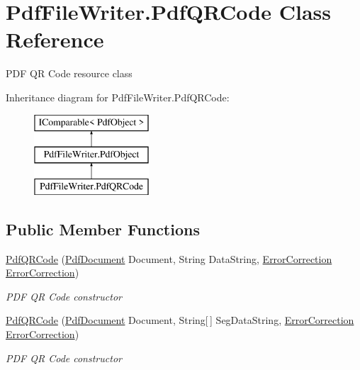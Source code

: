 \hypertarget{class_pdf_file_writer_1_1_pdf_q_r_code}{}\section{Pdf\+File\+Writer.\+Pdf\+Q\+R\+Code Class Reference}
\label{class_pdf_file_writer_1_1_pdf_q_r_code}


P\+DF QR Code resource class  


Inheritance diagram for Pdf\+File\+Writer.\+Pdf\+Q\+R\+Code\+:\begin{figure}[H]
\begin{center}
\leavevmode
\includegraphics[height=3.000000cm]{class_pdf_file_writer_1_1_pdf_q_r_code}
\end{center}
\end{figure}
\subsection*{Public Member Functions}
\begin{DoxyCompactItemize}
\item 
\hyperlink{class_pdf_file_writer_1_1_pdf_q_r_code_a20151e5e5e76d6fe0626697d987ea29a}{Pdf\+Q\+R\+Code} (\hyperlink{class_pdf_file_writer_1_1_pdf_document}{Pdf\+Document} Document, String Data\+String, \hyperlink{namespace_pdf_file_writer_ab10bd1f8ed3523b70c151f8d49093962}{Error\+Correction} \hyperlink{namespace_pdf_file_writer_ab10bd1f8ed3523b70c151f8d49093962}{Error\+Correction})
\begin{DoxyCompactList}\small\item\em P\+DF QR Code constructor \end{DoxyCompactList}\item 
\hyperlink{class_pdf_file_writer_1_1_pdf_q_r_code_a885c2236533d4b3bdc14fde8876c773d}{Pdf\+Q\+R\+Code} (\hyperlink{class_pdf_file_writer_1_1_pdf_document}{Pdf\+Document} Document, String\mbox{[}$\,$\mbox{]} Seg\+Data\+String, \hyperlink{namespace_pdf_file_writer_ab10bd1f8ed3523b70c151f8d49093962}{Error\+Correction} \hyperlink{namespace_pdf_file_writer_ab10bd1f8ed3523b70c151f8d49093962}{Error\+Correction})
\begin{DoxyCompactList}\small\item\em P\+DF QR Code constructor \end{DoxyCompactList}\end{DoxyCompactItemize}
